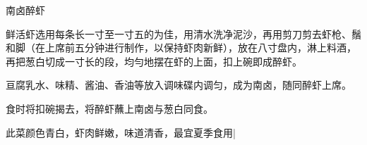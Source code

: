 \begin{recipe}{南卤醉虾}

\ingredients


\cooking

\step 鲜活虾选用每条长一寸至一寸五的为佳，用清水洗净泥沙，再用剪刀剪去虾枪、鬚和脚（在上席前五分钟进行制作，以保持虾肉新鲜），放在八寸盘内，淋上料酒，再把葱白切成一寸长的段，均勻地摆在虾的上面，扣上碗即成醉虾。

\step 亘腐乳水、味精、酱油、香油等放入调味碟内调匀，成为南卤，随同醉虾上席。

\step 食时将扣碗揭去，将醉虾蘸上南卤与葱白同食。

\notes

此菜颜色青白，虾肉鲜嫩，味道清香，最宜夏季食用|

\end{recipe}

